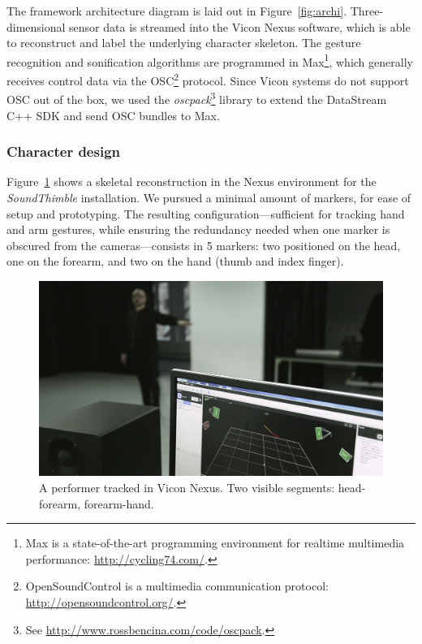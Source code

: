 \documentclass{nime-alternate}
\begin{document}
The framework architecture diagram is laid out in Figure~\ref{fig:archi}. Three-dimensional sensor data is streamed into the Vicon Nexus software, which is able to reconstruct and label the underlying character skeleton. The gesture recognition and sonification algorithms are programmed in Max\footnote{Max is a state-of-the-art programming environment for realtime multimedia performance: \url{http://cycling74.com/}.}, which generally receives control data via the OSC\footnote{OpenSoundControl is a multimedia communication protocol: \url{http://opensoundcontrol.org/}.} protocol. Since Vicon systems do not support OSC out of the box, we used the \textit{oscpack}\footnote{See \url{http://www.rossbencina.com/code/oscpack}.} library to extend the DataStream C++ SDK and send OSC bundles to Max.


\subsubsection{Character design}

Figure~\ref{fig:nexus} shows a skeletal reconstruction in the Nexus environment for the \textit{SoundThimble} installation. We pursued a minimal amount of markers, for ease of setup and prototyping. The resulting configuration---sufficient for tracking hand and arm gestures, while ensuring the redundancy needed when one marker is obscured from the cameras---consists in 5 markers: two positioned on the head, one on the forearm, and two on the hand (thumb and index finger).

\begin{figure}[ht]
	\centering
	\includegraphics[width=\columnwidth, clip, trim={12cm 0 0 0}]{img/nexus}
	\caption{A performer tracked in Vicon Nexus. Two visible segments: head-forearm, forearm-hand.}
	\label{fig:nexus}
\end{figure}
\end{document}
